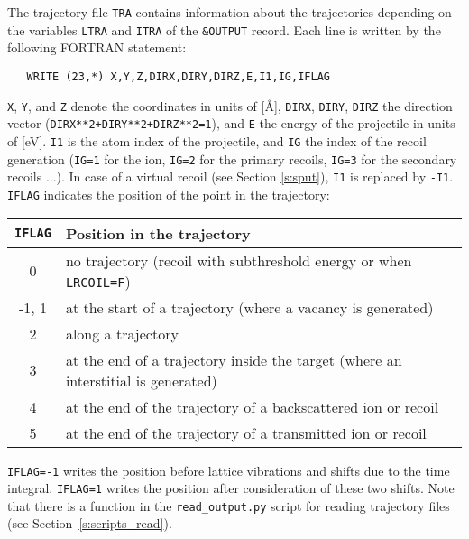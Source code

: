 The trajectory file \texttt{TRA} contains information about the trajectories
depending on the variables \texttt{LTRA} and \texttt{ITRA} of the
\texttt{\&OUTPUT} record. Each line is written by the following FORTRAN
statement:
%
\begin{verbatim}
   WRITE (23,*) X,Y,Z,DIRX,DIRY,DIRZ,E,I1,IG,IFLAG
\end{verbatim}
%
\texttt{X}, \texttt{Y}, and \texttt{Z} denote the coordinates in units of [\AA],
\texttt{DIRX}, \texttt{DIRY}, \texttt{DIRZ} the direction vector
(\texttt{DIRX**2+DIRY**2+DIRZ**2=1}), and \texttt{E} the energy of the
projectile in units of [eV]. \texttt{I1} is the atom index of the projectile,
and \texttt{IG} the index of the recoil generation (\texttt{IG=1} for the ion,
\texttt{IG=2} for the primary recoils, \texttt{IG=3} for the secondary recoils
...).  In case of a virtual recoil (see Section \ref{s:sput}), \texttt{I1} is
replaced by \texttt{-I1}. \texttt{IFLAG} indicates the position of the point in
the trajectory:
%
\bigskip
%
\begin{center}
\begin{tabular}{|c|p{}|}
\hline
\texttt{IFLAG} & Position in the trajectory                               \\
\hline
0              & no trajectory (recoil with subthreshold energy or when \texttt{LRCOIL=F}) \\
-1, 1          & at the start of a trajectory (where a vacancy is generated) \\
2              & along a trajectory \\
3              & at the end of a trajectory inside the target (where an interstitial is 
                 generated) \\
4              & at the end of the trajectory of a backscattered ion or recoil \\
5              & at the end of the trajectory of a transmitted ion or recoil \\
\hline
\end{tabular}
\end{center}

\texttt{IFLAG=-1} writes the position before lattice vibrations and shifts due
to the time integral. \texttt{IFLAG=1} writes the position after consideration
of these two shifts. Note that there is a function in the
\texttt{read\_output.py} script for reading trajectory files (see
Section~\ref{s:scripts_read}).
